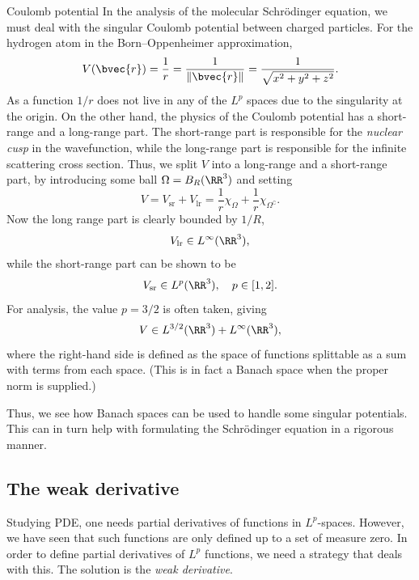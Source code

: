 \begin{myExample}{Coulomb potential}{}
In the analysis of the molecular Schrödinger equation, we must deal with the singular Coulomb potential between charged particles. For the hydrogen atom in the Born--Oppenheimer approximation,
\begin{equation}
V(\bvec{r}) = \frac{1}{r} = \frac{1}{\|\bvec{r}\|} = \frac{1}{\sqrt{x^2 + y^2 + z^2}}.
\end{equation}
As a function $1/r$ does not live in any of the $L^p$ spaces due to the singularity at the origin. On the other hand, the physics of the Coulomb potential has a short-range and a long-range part. The short-range part is responsible for the \emph{nuclear cusp} in the wavefunction, while the long-range part is responsible for the infinite scattering cross section. Thus, we split $V$ into a long-range and a short-range part, by introducing some ball $\Omega = B_R(\RR^3)$ and setting
\begin{equation}
V = V_\text{sr} + V_\text{lr} = \frac{1}{r} \chi_\Omega + \frac{1}{r}\chi_{\Omega^\complement}.
\end{equation}
Now the long range part is clearly bounded by $1/R$,
\begin{equation}
    V_\text{lr} \in L^\infty(\RR^3),
\end{equation}
while the short-range part can be shown to be
\begin{equation}
    V_\text{sr} \in L^p(\RR^3), \quad p \in [1,2].
\end{equation}
For analysis, the value $p=3/2$ is often taken, giving
\begin{equation}
    V \in L^{3/2}(\RR^3) + L^\infty(\RR^3),
\end{equation}
where the right-hand side is defined as the space of functions splittable as a sum with terms from each space. (This is in fact a Banach space when the proper norm is supplied.)

Thus, we see how Banach spaces can be used to handle some  singular potentials. This can in turn help with formulating the Schr\"odinger equation in a rigorous manner.
\end{myExample}

\subsection{The weak derivative}

Studying PDE, one needs partial derivatives of functions in $L^p$-spaces. However, we have seen that such functions are only defined up to a set of measure zero. In order to define partial derivatives of $L^p$ functions, we need a strategy that deals with this. The solution is the \emph{weak derivative}.

